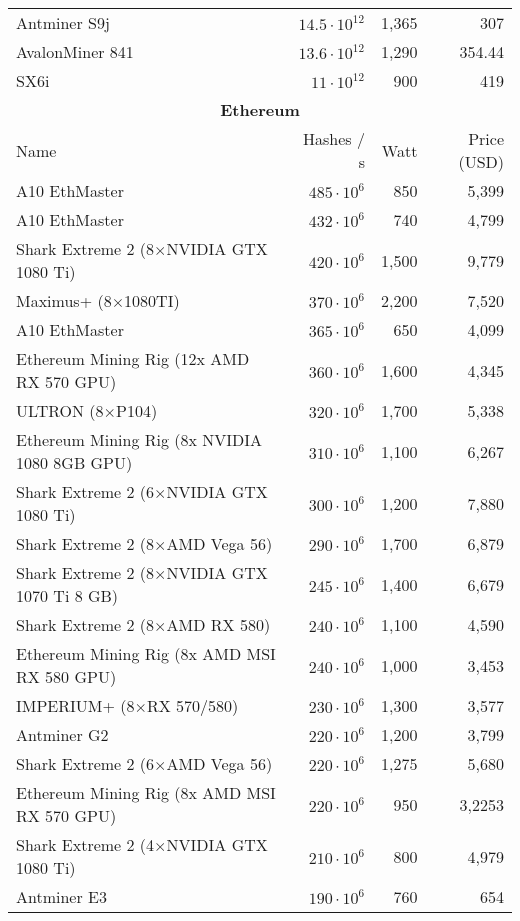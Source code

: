 \begin{longtable}{|p{}|r|r|r|}
  Antminer S9j & $14.5 \cdot 10^{12}$ & 1,365 & 307 \\
  AvalonMiner 841 & $13.6 \cdot 10^{12}$ & 1,290 & 354.44 \\
  SX6i & $11 \cdot 10^{12}$ & 900 & 419 \\
  \hline
  \multicolumn{4}{|c|}{\textbf{Ethereum}} \\
  \hline
  Name & Hashes / s & Watt & Price (USD) \\
  \hhline{|=|=|=|=|}
  A10 EthMaster & $485 \cdot 10^{6}$ & 850 & 5,399 \\
  A10 EthMaster & $432 \cdot 10^{6}$ & 740 & 4,799 \\
  Shark Extreme 2 (8$ \times $NVIDIA GTX 1080 Ti) & $420 \cdot 10^{6}$ & 1,500 & 9,779 \\
  Maximus+ (8$ \times $1080TI) & $370 \cdot 10^{6}$ & 2,200 & 7,520 \\
  A10 EthMaster & $365 \cdot 10^{6}$ & 650 & 4,099 \\
  Ethereum Mining Rig (12x AMD RX 570 GPU) & $360 \cdot 10^{6}$ & 1,600 & 4,345 \\
  ULTRON (8$ \times $P104) & $320 \cdot 10^{6}$ & 1,700 & 5,338 \\
  Ethereum Mining Rig (8x NVIDIA 1080 8GB GPU) & $310 \cdot 10^{6}$ & 1,100 & 6,267 \\
  Shark Extreme 2 (6$ \times $NVIDIA GTX 1080 Ti) & $300 \cdot 10^{6}$ & 1,200 & 7,880 \\
  Shark Extreme 2 (8$ \times $AMD Vega 56) & $290 \cdot 10^{6}$ & 1,700 & 6,879 \\
  Shark Extreme 2 (8$ \times $NVIDIA GTX 1070 Ti 8 GB) & $245 \cdot 10^{6}$ & 1,400 & 6,679 \\
  Shark Extreme 2 (8$ \times $AMD RX 580) & $240 \cdot 10^{6}$ & 1,100 & 4,590 \\
  Ethereum Mining Rig (8x AMD MSI RX 580 GPU) & $240 \cdot 10^{6}$ & 1,000 & 3,453 \\
  IMPERIUM+ (8$ \times $RX 570/580) & $230 \cdot 10^{6}$ & 1,300 & 3,577 \\
  Antminer G2 & $220 \cdot 10^{6}$ & 1,200 & 3,799 \\
  Shark Extreme 2 (6$ \times $AMD Vega 56) & $220 \cdot 10^{6}$ & 1,275 & 5,680 \\
  Ethereum Mining Rig (8x AMD MSI RX 570 GPU) & $220 \cdot 10^{6}$ & 950 & 3,2253 \\
  Shark Extreme 2 (4$ \times $NVIDIA GTX 1080 Ti) & $210 \cdot 10^{6}$ & 800 & 4,979 \\
  Antminer E3 & $190 \cdot 10^{6}$ & 760 & 654 \\

\end{longtable}

